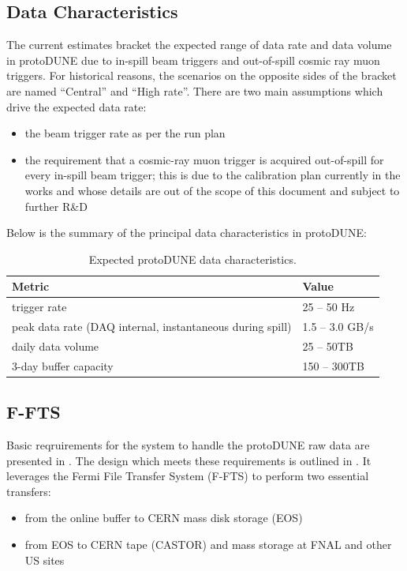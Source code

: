 \documentclass[pdftex,12pt,letter]{article}
\newcommand{\pd}{protoDUNE\xspace}
\begin{document}
\subsection{Data Characteristics}

The current estimates \cite{docdb1086} bracket the expected range of data rate
and data volume in \pd \cite{docdb186} due to in-spill beam triggers and out-of-spill cosmic ray muon triggers.
For historical reasons, the scenarios on the opposite sides of the bracket are named ``Central'' and ``High rate''.
There are two main assumptions which drive the expected data rate:
\begin{itemize}
\item the beam trigger rate as per the run plan
\item the requirement that a cosmic-ray muon trigger is acquired out-of-spill for every in-spill beam trigger; this is due to
the calibration plan currently in the works and whose details are out of the scope of this document and subject to
further R\&D
\end{itemize}
\noindent Below is the summary of the principal data characteristics in \pd:
\begin{table}[tbh]
\centering
\begin{tabular}{l l}
\hline
\textbf{Metric} & \textbf{Value} \\
\hline
\hline
trigger rate				& 25 -- 50 Hz \\  \hline
peak data rate (DAQ internal, instantaneous during spill)	& 1.5 -- 3.0 GB/s \\ \hline
daily data volume &  25 -- 50TB \\ \hline
3-day buffer capacity & 150 -- 300TB \\  \hline
\hline
\end{tabular}
\caption{\label{tab:data_char}Expected protoDUNE data characteristics.}
\end{table}

\subsection{F-FTS}
Basic reqruirements for the system to handle the \pd raw data are presented in \cite{docdb1209}.
The design which meets these requirements is outlined in \cite{docdb1212}. It leverages the
Fermi File Transfer System (F-FTS) to perform two essential transfers:
\begin{itemize}
\item from the online buffer to CERN mass disk storage (EOS)
\item from EOS to CERN tape (CASTOR) and  mass storage at FNAL and other US sites
\end{itemize}
\end{document}
